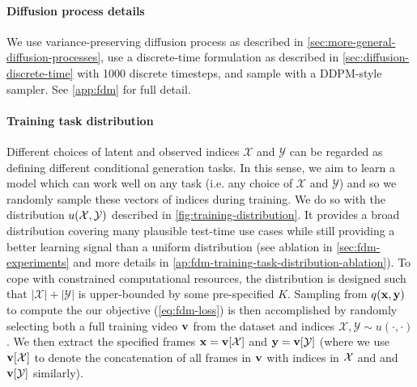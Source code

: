 \paragraph{Diffusion process details}
We use variance-preserving diffusion process as described in \cref{sec:more-general-diffusion-processes}, use a discrete-time formulation as described in \cref{sec:diffusion-discrete-time} with 1000 discrete timesteps, and sample with a DDPM-style sampler. See \cref{app:fdm} for full detail.

\paragraph{Training task distribution}
Different choices of latent and observed indices $\mathcal{X}$ and $\mathcal{Y}$ can be regarded as defining different conditional generation tasks. In this sense, we aim to learn a model which can work well on any task (i.e. any choice of $\mathcal{X}$ and $\mathcal{Y}$) and so we randomly sample these vectors of indices during training. We do so with the distribution $u(\mathcal{X},\mathcal{Y})$ described in \cref{fig:training-distribution}. It provides a broad distribution covering many plausible test-time use cases while still providing a better learning signal than a uniform distribution (see ablation in \cref{sec:fdm-experiments} and more details in \cref{ap:fdm-training-task-distribution-ablation}). To cope with constrained computational resources, the distribution is designed such that $|\mathcal{X}|+|\mathcal{Y}|$ is upper-bounded by some pre-specified $K$. Sampling from $q({\mathbf{x}}, {\mathbf{y}})$ to compute the our objective (\cref{eq:fdm-loss}) is then accomplished by randomly selecting both a full training video ${\mathbf{v}}$ from the dataset and indices $\mathcal{X},\mathcal{Y}\sim u(\cdot,\cdot)$. We then extract the specified frames ${\mathbf{x}} = {\mathbf{v}}[\mathcal{X}]$ and ${\mathbf{y}} = {\mathbf{v}}[\mathcal{Y}]$ (where we use ${\mathbf{v}}[\mathcal{X}]$ to denote the concatenation of all frames in ${\mathbf{v}}$ with indices in $\mathcal{X}$ and and ${\mathbf{v}}[\mathcal{Y}]$ similarly).

